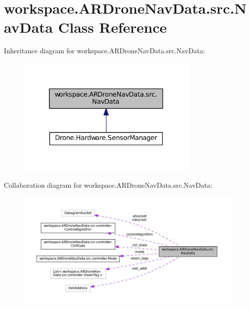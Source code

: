 \hypertarget{classworkspace_1_1_a_r_drone_nav_data_1_1src_1_1_nav_data}{}\section{workspace.\+A\+R\+Drone\+Nav\+Data.\+src.\+Nav\+Data Class Reference}
\label{classworkspace_1_1_a_r_drone_nav_data_1_1src_1_1_nav_data}


Inheritance diagram for workspace.\+A\+R\+Drone\+Nav\+Data.\+src.\+Nav\+Data\+:\nopagebreak
\begin{figure}[H]
\begin{center}
\leavevmode
\includegraphics[width=254pt]{classworkspace_1_1_a_r_drone_nav_data_1_1src_1_1_nav_data__inherit__graph}
\end{center}
\end{figure}


Collaboration diagram for workspace.\+A\+R\+Drone\+Nav\+Data.\+src.\+Nav\+Data\+:\nopagebreak
\begin{figure}[H]
\begin{center}
\leavevmode
\includegraphics[width=350pt]{classworkspace_1_1_a_r_drone_nav_data_1_1src_1_1_nav_data__coll__graph}
\end{center}
\end{figure}
